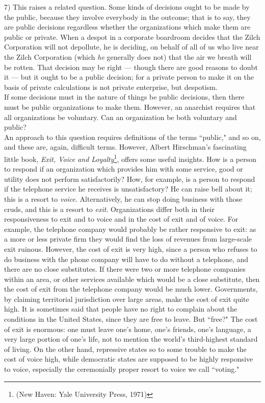 \documentclass[12pt, onecolumn, letterpaper, oneside]{book}
\begin{document}
7) This raises a related question. Some kinds of decisions ought to be made by the public, because they involve everybody in the outcome; that is to say, they are public decisions regardless whether the organizations which make them are public or private. When a despot in a corporate boardroom decides that the Zilch Corporation will not depollute, he is deciding, on behalf of all of us who live near the Zilch Corporation (which \emph{he} generally does not) that the air we breath will be rotten. That decision may be right --- though there are good reasons to doubt it --- but it ought to be a public decision; for a private person to make it on the basis of private calculations is not private enterprise, but despotism.\\
If some decisions must in the nature of things be public decisions, then there must be public organizations to make them. However, an anarchist requires that all organizations be voluntary. Can an organization be both voluntary and public?\\
An approach to this question requires definitions of the terms ``public," and so on, and these are, again, difficult terms. However, Albert Hirschman's fascinating little book, \emph{Exit, Voice and Loyalty}\footnote{(New Haven: Yale University Press, 1971)}, offers some useful insights. How is a person to respond if an organization which provides him with some service, good or utility does not perform satisfactorily? How, for example, is a person to respond if the telephone service he receives is unsatisfactory? He can raise bell about it; this is a resort to \emph{voice}. Alternatively, he can stop doing business with those cruds, and this is a resort to \emph{exit}. Organizations differ both in their responsiveness to exit and to voice and in the cost of exit and of voice. For example, the telephone company would probably be rather responsive to exit: as a more or less private firm they would find the loss of revenues from large-scale exit ruinous. However, the cost of exit is very high, since a person who refuses to do business with the phone company will have to do without a telephone, and there are no close substitutes. If there were two or more telephone companies within an area, or other services available which would be a close substitute, then the cost of exit from the telephone company would be much lower. Governments, by claiming territorial jurisdiction over large areas, make the cost of exit quite high. It is sometimes said that people have no right to complain about the conditions in the United States, since they are free to leave. But ``free?" The cost of exit is enormous: one must leave one's home, one's friends, one's language, a very large portion of one's life, not to mention the world's third-highest standard of living. On the other hand, repressive states so to some trouble to make the cost of voice high, while democratic states are supposed to be highly responsive to voice, especially the ceremonially proper resort to voice we call ``voting."\\
\end{document}
